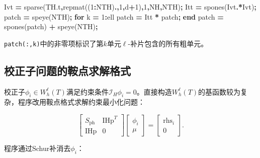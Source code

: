 \documentclass[
]{article}
\newenvironment{Shaded}{\begin{snugshade}}{\end{snugshade}}
\newcommand{\FloatTok}[1]{\textcolor[rgb]{0.00,0.00,0.81}{#1}}
\newcommand{\KeywordTok}[1]{\textcolor[rgb]{0.13,0.29,0.53}{\textbf{#1}}}
\newcommand{\NormalTok}[1]{#1}
\newcommand{\OperatorTok}[1]{\textcolor[rgb]{0.81,0.36,0.00}{\textbf{#1}}}
\newcommand{\VariableTok}[1]{\textcolor[rgb]{0.00,0.00,0.00}{#1}}
\begin{document}
\begin{Shaded}
\begin{Highlighting}[]
\VariableTok{Ivt} \OperatorTok{=} \VariableTok{sparse}\NormalTok{(}\VariableTok{TH}\NormalTok{.}\VariableTok{t}\OperatorTok{,}\VariableTok{repmat}\NormalTok{((}\FloatTok{1}\OperatorTok{:}\VariableTok{NTH}\NormalTok{)}\OperatorTok{.\textquotesingle{},}\FloatTok{1}\OperatorTok{,}\VariableTok{d}\OperatorTok{+}\FloatTok{1}\NormalTok{)}\OperatorTok{,}\FloatTok{1}\OperatorTok{,}\VariableTok{NH}\OperatorTok{,}\VariableTok{NTH}\NormalTok{)}\OperatorTok{;}
\VariableTok{Itt} \OperatorTok{=} \VariableTok{spones}\NormalTok{(}\VariableTok{Ivt}\OperatorTok{.\textquotesingle{}*}\VariableTok{Ivt}\NormalTok{)}\OperatorTok{;}
\VariableTok{patch} \OperatorTok{=} \VariableTok{speye}\NormalTok{(}\VariableTok{NTH}\NormalTok{)}\OperatorTok{;}
\KeywordTok{for} \VariableTok{k} \OperatorTok{=} \FloatTok{1}\OperatorTok{:}\VariableTok{ell}
    \VariableTok{patch} \OperatorTok{=} \VariableTok{Itt} \OperatorTok{*} \VariableTok{patch}\OperatorTok{;}
\KeywordTok{end}
\VariableTok{patch} \OperatorTok{=} \VariableTok{spones}\NormalTok{(}\VariableTok{patch}\NormalTok{) }\OperatorTok{+} \VariableTok{speye}\NormalTok{(}\VariableTok{NTH}\NormalTok{)}\OperatorTok{;}
\end{Highlighting}
\end{Shaded}

\texttt{patch(:,k)}中的非零项标识了第\(k\)单元\(\ell\)-补片包含的所有粗单元。

\subsection{校正子问题的鞍点求解格式}\label{chap-5-3}

校正子\(\phi_i \in W_h^\ell(T)\)满足约束条件\(\mathcal{I}_H \phi_i = 0\)。直接构造\(W_h^\ell(T)\)的基函数较为复杂，程序改用鞍点格式求解约束最小化问题：

\[
\begin{bmatrix}
S_{\mathrm{ph}} & \mathrm{IHp}^T \\
\mathrm{IHp} & 0
\end{bmatrix}
\begin{bmatrix}
\phi_i \\ \mu
\end{bmatrix}
=
\begin{bmatrix}
\mathrm{rhs}_i \\ 0
\end{bmatrix}.
\]

程序通过Schur补消去\(\phi_i\)：
\end{document}
